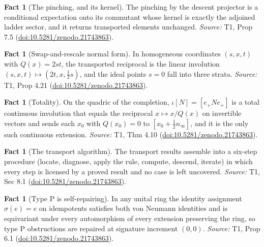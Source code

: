 \documentclass[11pt]{article}
\theoremstyle{definition}
\newtheorem{fact}[theorem]{Fact}
\theoremstyle{plain}
\providecommand{\nInf}{}\renewcommand{\nInf}{n_\infty}
\begin{document}
\begin{fact}[The pinching, and its kernel]\label{c:transport.pinching-kernel}
The pinching by the descent projector is a conditional expectation onto its commutant whose kernel is exactly the adjoined ladder sector, and it returns transported elements unchanged.
\emph{Source:} T1, Prop 7.5 (\href{https://doi.org/10.5281/zenodo.21743863}{doi:10.5281/zenodo.21743863}).
\end{fact}

\begin{fact}[Swap-and-rescale normal form]\label{c:transport.swap-rescale-normal-form}
In homogeneous coordinates $(s, x, t)$ with $Q(x) = 2st$, the transported reciprocal is the linear involution $(s, x, t) \mapsto (2t, x, \frac12 s)$, and the ideal points $s = 0$ fall into three strata.
\emph{Source:} T1, Prop 4.21 (\href{https://doi.org/10.5281/zenodo.21743863}{doi:10.5281/zenodo.21743863}).
\end{fact}

\begin{fact}[Totality]\label{c:transport.totality}
On the quadric of the completion, $\iota[N] = [e_+ N e_+]$ is a total continuous involution that equals the reciprocal $x \mapsto x/Q(x)$ on invertible vectors and sends each $x_0$ with $Q(x_0) = 0$ to $[x_0 + \frac12 \nInf]$, and it is the only such continuous extension.
\emph{Source:} T1, Thm 4.10 (\href{https://doi.org/10.5281/zenodo.21743863}{doi:10.5281/zenodo.21743863}).
\end{fact}

\begin{fact}[The transport algorithm]\label{c:transport.transport-algorithm}
The transport results assemble into a six-step procedure (locate, diagnose, apply the rule, compute, descend, iterate) in which every step is licensed by a proved result and no case is left uncovered.
\emph{Source:} T1, Sec 8.1 (\href{https://doi.org/10.5281/zenodo.21743863}{doi:10.5281/zenodo.21743863}).
\end{fact}

\begin{fact}[Type P is self-repairing]\label{c:transport.type-p-self-repairing}
In any unital ring the identity assignment $\sigma(e) = e$ on idempotents satisfies both von Neumann identities and is equivariant under every automorphism of every extension preserving the ring, so type P obstructions are repaired at signature increment $(0,0)$.
\emph{Source:} T1, Prop 6.1 (\href{https://doi.org/10.5281/zenodo.21743863}{doi:10.5281/zenodo.21743863}).
\end{fact}
\end{document}
